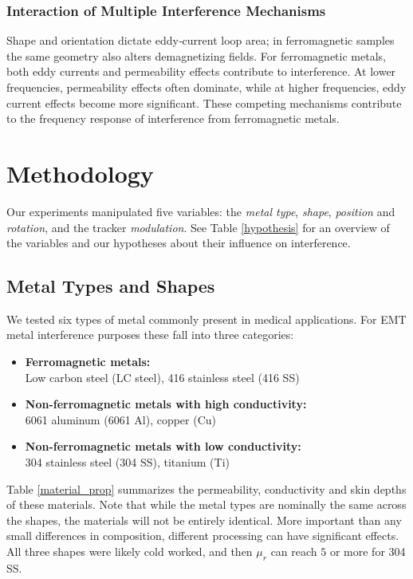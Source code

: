 \documentclass[journal,twoside,web]{ieeecolor}
\begin{document}
\subsubsection{Interaction of Multiple Interference Mechanisms}
\label{subsubsec:mechanisim_summary}
Shape and orientation dictate eddy‑current loop area; in ferromagnetic samples the same geometry also alters demagnetizing fields. For ferromagnetic metals, both eddy currents and permeability effects contribute to interference. At lower frequencies, permeability effects often dominate, while at higher frequencies, eddy current effects become more significant. These competing mechanisms contribute to the frequency response of interference from ferromagnetic metals.

\section{Methodology}
Our experiments manipulated five variables: the \textit{metal type}, \textit{shape}, \textit{position} and \textit{rotation}, and the tracker \textit{modulation}. See Table \ref{hypothesis} for an overview of the variables and our hypotheses about their influence on interference.

\subsection{Metal Types and Shapes}
\label{subsec:metal_types}
We tested six types of metal commonly present in medical applications. For EMT metal interference purposes these fall into three categories: 
\begin{itemize}
\item \textbf{Ferromagnetic metals:}\\ 
Low carbon steel (LC steel), 416 stainless steel (416 SS)

\item \textbf{Non-ferromagnetic metals with high conductivity:}\\
6061 aluminum (6061 Al), copper (Cu)

\item \textbf{Non-ferromagnetic metals with low conductivity:}\\
304 stainless steel (304 SS), titanium (Ti)
\end{itemize}

Table \ref{material_prop} summarizes the permeability, conductivity and skin depths of these materials\cite{bowler_frequency-dependence_2006,callister_notitle_2019,mitchell_notitle_2010}.
Note that while the metal types are nominally the same across the shapes, the materials will not be entirely identical. More important than any small differences in composition, different processing can have significant effects. All three shapes were likely cold worked, and then $\mu_r$ can reach $5$ or more for 304 SS.
\end{document}
